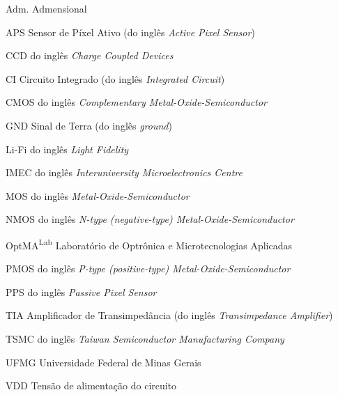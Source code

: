 \begin{siglas}
  
  \item[Adm.] Admensional
  \item[APS] Sensor de Píxel Ativo (do inglês \textit{Active Pixel Sensor})
  \item[CCD] do inglês \textit{Charge Coupled Devices}
  \item[CI] Circuito Integrado (do inglês  \textit{Integrated Circuit})
  \item[CMOS] do inglês \textit{Complementary Metal-Oxide-Semiconductor}
  \item[GND] Sinal de Terra (do inglês \textit{ground})
  \item[Li-Fi] do inglês \textit{Light Fidelity}
  \item[IMEC] do inglês \textit{Interuniversity Microelectronics Centre}
  \item[MOS] do inglês \textit{Metal-Oxide-Semiconductor}
  \item[NMOS] do inglês \textit{N-type (negative-type) Metal-Oxide-Semiconductor}
  \item[OptMA\textsuperscript{Lab}] Laboratório de Optrônica e Microtecnologias Aplicadas
  \item[PMOS] do inglês \textit{P-type (positive-type) Metal-Oxide-Semiconductor}
  \item[PPS] do inglês \textit{Passive Pixel Sensor}
  \item[TIA] Amplificador de Transimpedância (do inglês \textit{Transimpedance Amplifier})
  \item[TSMC] do inglês \textit{Taiwan Semiconductor Manufacturing Company}
  \item[UFMG] Universidade Federal de Minas Gerais
  \item[VDD] Tensão de alimentação do circuito
 
\end{siglas}
